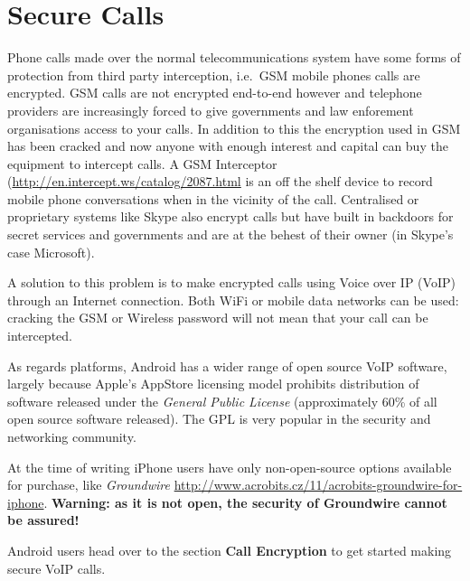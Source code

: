 \section{Secure Calls}

Phone calls made over the normal telecommunications system have some
forms of protection from third party interception, i.e.~GSM mobile
phones calls are encrypted. GSM calls are not encrypted end-to-end
however and telephone providers are increasingly forced to give
governments and law enforement organisations access to your calls. In
addition to this the encryption used in GSM has been cracked and now
anyone with enough interest and capital can buy the equipment to
intercept calls. A GSM Interceptor
(\href{http://en.intercept.ws/catalog/2087.html}{http://en.intercept.ws/catalog/2087.html}
is an off the shelf device to record mobile phone conversations when in
the vicinity of the call. Centralised or proprietary systems like Skype
also encrypt calls but have built in backdoors for secret services and
governments and are at the behest of their owner (in Skype's case
Microsoft).

A solution to this problem is to make encrypted calls using Voice over
IP (VoIP) through an Internet connection. Both WiFi or mobile data
networks can be used: cracking the GSM or Wireless password will not
mean that your call can be intercepted.

As regards platforms, Android has a wider range of open source VoIP
software, largely because Apple's AppStore licensing model prohibits
distribution of software released under the \emph{General Public
License} (approximately 60\% of all open source software released). The
GPL is very popular in the security and networking community.

At the time of writing iPhone users have only non-open-source options
available for purchase, like \emph{Groundwire}
\href{http://www.acrobits.cz/11/acrobits-groundwire-for-iphone}{http://www.acrobits.cz/11/acrobits-groundwire-for-iphone}.
\textbf{Warning: as it is not open, the security of Groundwire cannot be
assured!}

Android users head over to the section \textbf{Call Encryption} to get
started making secure VoIP calls.
